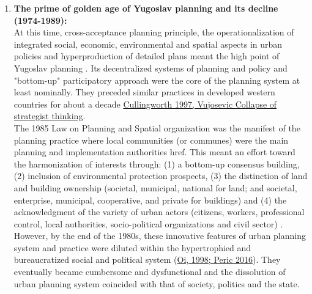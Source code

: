 \documentclass[11pt]{report}
\begin{document}
\begin{enumerate}
The decentralizing political and economic measures\footnote{Strengthening the role of the Federal units and semi-market economic system} contributed to the introduction of integrated and comprehensive planning in Yugoslav context. Its main achievements are:
(1) the administrative hierarchy  and the distribution of plans,
(2) interdisciplinary planning practice,
(3) increased public participation, and
(4) social approach through the mass provision of affordable housing \cite{Vesna Cagic 2014, Peric 2016}. This model was introduced as the ‘Basic Policy on Urbanism and Spatial Ordering’ and passed by the State Parliament in 1971 \href{ref}{\citealt{nedovicbudic_waves_2006}}.
Namely, Yugoslav planning system was internationally acknowledged as significantly decentralized and multidisciplinary with strong tendencies to include and balance spatial, social, economic, and environmental principles (\href{ref}{\citealt{simmie_self-management_1989}}; \href{ref}{\citealt{Miodrag Vujosevic, 2003}}, \href{ref}{\citealt{peric_evolution_2016}}).

\item \textbf{The prime of golden age of Yugoslav planning and its decline (1974-1989):}
\\
At this time, cross-acceptance planning principle, the operationalization of integrated social, economic, environmental and spatial aspects in urban policies and hyperproduction of detailed plans meant the high point of Yugoslav planning \cite{Mornings after Nedovic Budic}.
Its decentralized systems of planning and policy and "bottom-up" participatory approach were the core of the planning system at least nominally. They preceded similar practices in developed western countries for about a decade \href{ref}{Cullingworth 1997, Vujosevic Collapse of strategist thinking}.
\\

The 1985 Law on Planning and Spatial organization was the manifest of the planning practice where local communities (or communes) were the main planning and implementation authorities href{}{\citealt{vujosevic_planning_2006}}. This meant an effort toward the harmonization of interests through:
(1) a bottom-up consensus building,
(2) inclusion of environmental protection prospects,
(3) the distinction of land and building ownership (societal, municipal, national for land; and societal, enterprise, municipal, cooperative, and private for buildings) and
(4) the acknowledgment of the variety of urban actors (citizens, workers, professional control, local authorities, socio-political organizations and civil sector) \cite{adjustment of planning practice nedovic budic 2001}.
However, by the end of the 1980s, these innovative features of urban planning system and practice were diluted within the hypertrophied and bureaucratized social and political system (\href{ref}{Oi, 1998; Peric 2016}). They eventually became cumbersome and dysfunctional and the dissolution of urban planning system coincided with that of society, politics and the state.
\end{enumerate}
\end{document}
